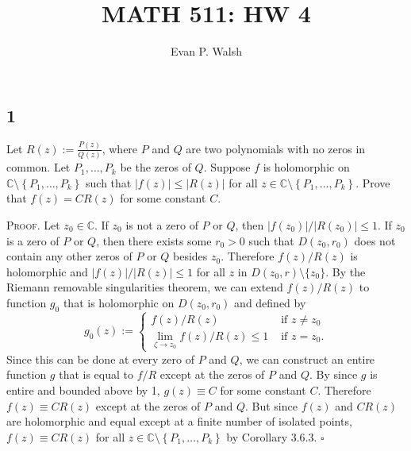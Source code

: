 \documentclass[12pt]{article}
\title{MATH 511: HW 4}
\author{Evan P. Walsh}
\newcounter{ProofCounter}
\newenvironment{Proof}{\stepcounter{ProofCounter}\textsc{Proof.}}{\hfill$\square$}
\begin{document}
\maketitle

\subsection*{1}
\begin{tcolorbox}
Let $R(z) := \frac{P(z)}{Q(z)}$, where $P$ and $Q$ are two polynomials with no zeros in common. Let $P_1, \hdots, P_k$ be the zeros of $Q$. Suppose
$f$ is holomorphic on $\mathbb{C} \setminus \left\{ P_1, \hdots, P_k \right\}$ such that $|f(z)| \leq |R(z)|$ for all $z \in \mathbb{C} \setminus
\left\{ P_1,\hdots, P_k \right\}$. Prove that $f(z) = CR(z)$ for some constant $C$.
\end{tcolorbox}
\begin{Proof}
Let $z_0 \in \mathbb{C}$. If $z_0$ is not a zero of $P$ or $Q$, then $|f(z_0)| / |R(z_0)| \leq 1$. If $z_0$ is a zero of $P$ or $Q$,
then there exists some $r_0 > 0$ such that $D(z_0,r_0)$ does not contain any other zeros of $P$ or $Q$ besides $z_0$. Therefore $f(z) / R(z)$ is
holomorphic and $|f(z)| / |R(z)| \leq 1$ for all $z$ in $D(z_0, r) \setminus \{z_0\}$. By the Riemann removable singularities theorem, we can extend
$f(z) / R(z)$ to function $g_0$ that is holomorphic on $D(z_0, r_0)$ and defined by
\[ g_0(z) := \left\{ \begin{array}{cl}
f(z) / R(z) & \text{ if } z \neq z_0 \\
\lim_{\zeta\rightarrow z_0} f(z) / R(z) \leq 1 & \text{ if } z = z_0.
\end{array} \right. \]
Since this can be done at every zero of $P$ and $Q$, we can construct an entire function $g$ that is equal to $f / R$ except at the zeros of $P$ and
$Q$. By since $g$ is entire and bounded above by 1, $g(z) \equiv C$ for some constant $C$. Therefore $f(z) \equiv CR(z)$ except at the zeros of $P$
and $Q$. But since $f(z)$ and $CR(z)$ are holomorphic and equal except at a finite number of isolated points, $f(z) \equiv CR(z)$ for all $z \in \mathbb{C}
\setminus \left\{ P_1,\hdots, P_k \right\}$ by Corollary 3.6.3.
\end{Proof}

\newpage
\end{document}
